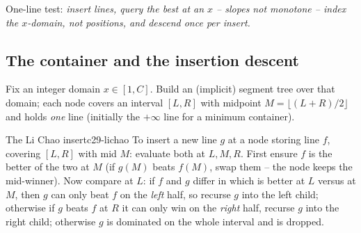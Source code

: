 \begin{recognitionbox}
One-line test: \emph{insert lines, query the best at an \(x\) -- slopes not
monotone -- index the \(x\)-domain, not positions, and descend once per insert.}
\end{recognitionbox}

\subsection{The container and the insertion descent}

Fix an integer domain \(x\in[1,C]\).  Build an (implicit) segment tree over that
domain; each node covers an interval \([L,R]\) with midpoint \(M=\lfloor(L+R)/2\rfloor\)
and holds \emph{one} line (initially the \(+\infty\) line for a minimum
container).

\begin{definition}{The Li Chao insert}{c29-lichao}
To insert a new line \(g\) at a node storing line \(f\), covering \([L,R]\) with
mid \(M\): evaluate both at \(L,M,R\).  First ensure \(f\) is the better of the
two at \(M\) (if \(g(M)\) beats \(f(M)\), swap them -- the node keeps the
mid-winner).  Now compare at \(L\): if \(f\) and \(g\) differ in which is better
at \(L\) versus at \(M\), then \(g\) can only beat \(f\) on the \emph{left}
half, so recurse \(g\) into the left child; otherwise if \(g\) beats \(f\) at
\(R\) it can only win on the \emph{right} half, recurse \(g\) into the right
child; otherwise \(g\) is dominated on the whole interval and is dropped.
\end{definition}

